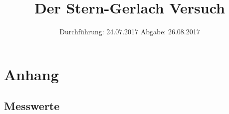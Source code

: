 

\subject{V25}
\title{Der Stern-Gerlach Versuch}
\date{
  Durchführung: 24.07.2017
  \hspace{3em}
  Abgabe: 26.08.2017
}



\maketitle
\thispagestyle{empty}
\tableofcontents
\newpage





\section{Anhang}
\label{sec:anhang}

\printbibliography
\subsection{Messwerte}
\label{sec:mess}








